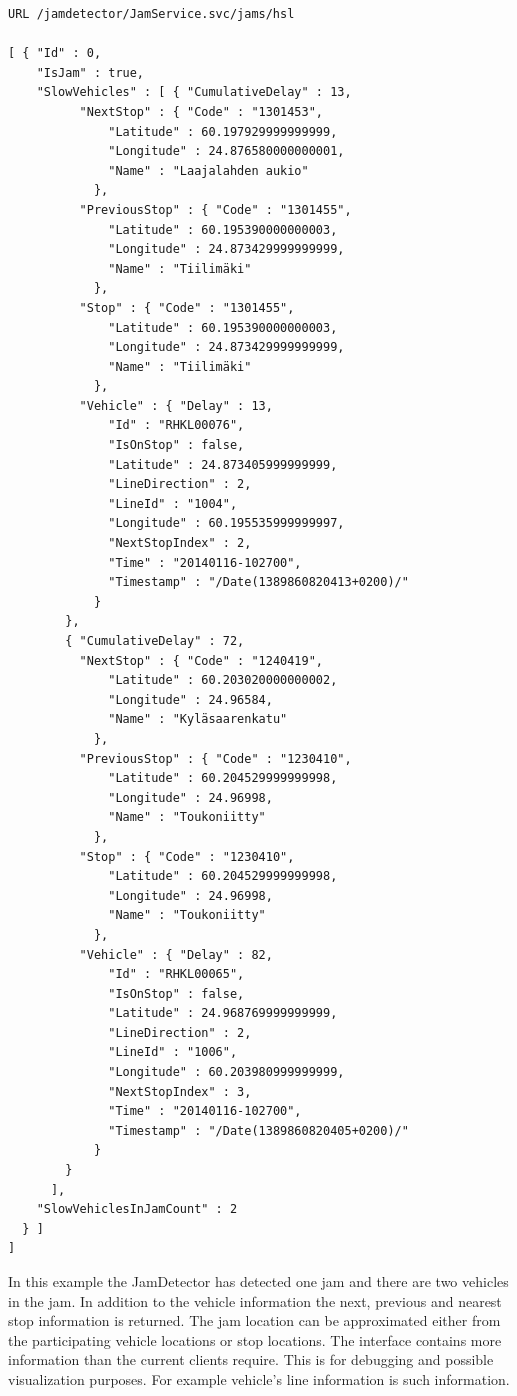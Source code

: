 \begin{verbatim}
URL /jamdetector/JamService.svc/jams/hsl

[ { "Id" : 0,
    "IsJam" : true,
    "SlowVehicles" : [ { "CumulativeDelay" : 13,
          "NextStop" : { "Code" : "1301453",
              "Latitude" : 60.197929999999999,
              "Longitude" : 24.876580000000001,
              "Name" : "Laajalahden aukio"
            },
          "PreviousStop" : { "Code" : "1301455",
              "Latitude" : 60.195390000000003,
              "Longitude" : 24.873429999999999,
              "Name" : "Tiilimäki"
            },
          "Stop" : { "Code" : "1301455",
              "Latitude" : 60.195390000000003,
              "Longitude" : 24.873429999999999,
              "Name" : "Tiilimäki"
            },
          "Vehicle" : { "Delay" : 13,
              "Id" : "RHKL00076",
              "IsOnStop" : false,
              "Latitude" : 24.873405999999999,
              "LineDirection" : 2,
              "LineId" : "1004",
              "Longitude" : 60.195535999999997,
              "NextStopIndex" : 2,
              "Time" : "20140116-102700",
              "Timestamp" : "/Date(1389860820413+0200)/"
            }
        },
        { "CumulativeDelay" : 72,
          "NextStop" : { "Code" : "1240419",
              "Latitude" : 60.203020000000002,
              "Longitude" : 24.96584,
              "Name" : "Kyläsaarenkatu"
            },
          "PreviousStop" : { "Code" : "1230410",
              "Latitude" : 60.204529999999998,
              "Longitude" : 24.96998,
              "Name" : "Toukoniitty"
            },
          "Stop" : { "Code" : "1230410",
              "Latitude" : 60.204529999999998,
              "Longitude" : 24.96998,
              "Name" : "Toukoniitty"
            },
          "Vehicle" : { "Delay" : 82,
              "Id" : "RHKL00065",
              "IsOnStop" : false,
              "Latitude" : 24.968769999999999,
              "LineDirection" : 2,
              "LineId" : "1006",
              "Longitude" : 60.203980999999999,
              "NextStopIndex" : 3,
              "Time" : "20140116-102700",
              "Timestamp" : "/Date(1389860820405+0200)/"
            }
        }
      ],
    "SlowVehiclesInJamCount" : 2
  } ]
]
\end{verbatim}

In this example the JamDetector has detected one jam and there are two
vehicles in the jam. In addition to the vehicle information the next,
previous and nearest stop information is returned. The jam location
can be approximated either from the participating vehicle locations or
stop locations.  The interface contains more information than the
current clients require. This is for debugging and possible
visualization purposes. For example vehicle’s line information is such
information.

